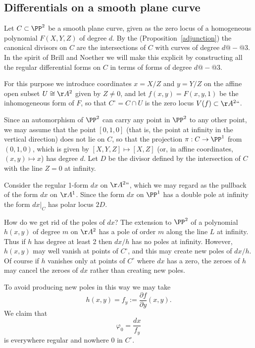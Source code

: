 \subsection{Differentials on a smooth plane curve}\label{canonical series on smooth plane curves}

Let $C \subset \PP^2$  be a smooth plane curve, given as the zero locus of a homogeneous polynomial $F(X,Y,Z)$ of degree $d$. By the 
%
(Proposition~\ref{adjunction}) the canonical  divisors on $C$
are the intersections of $C$ with curves of degree $d@{-}@3$. In the spirit of Brill and Noether we
will make this explicit by constructing all
 the 
regular differential forms
%
%
 on $C$ in terms of forms of degree $d@{-}@3$.

For this purpose we introduce coordinates $x = X/Z$ and $y = Y/Z$ on the affine open subset $U \cong \AA^2$ given by $Z \neq 0$, and let $f(x,y) = F(x, y,1)$ be the inhomogeneous form of $F$, so that $C^\circ = C \cap U$ is the zero locus $V(f) \subset  \AA^2` `$. 

Since an automorphism of $\PP^2$ can carry any point in $\PP^{2}$ to any other point, we may assume
that 
the point $[0,1,0]$ (that is, the point at infinity
in the vertical direction) does not lie on $C$, so that the
 projection  $\pi: C \to \PP^1$ from $(0,1,0)$, which is given by $[X,Y,Z] \mapsto [X,Z]$ (or, in affine coordinates, $(x,y) \mapsto x$)  has degree $d$. Let $D$ be the divisor defined by the intersection of $C$ with the line $Z=0$ at infinity.

Consider the
regular 1-form $dx$ on $\AA^2` `$, which we may regard as the pullback of the form $dx$ on
 $\AA^{1}$.
Since the form $dx$ on $\PP^{1}$ has a 
%
double pole
at infinity the form $dx|_{C}$ has polar
locus $2D$.
 
 \def\Co{{C^{\circ}}}
How do we get rid of the poles of $dx$? The extension to $\PP^2$ of a polynomial $h(x,y)$ of degree $m$ on
$\AA^2$ has a pole of order $m$ along the line $L$ at infinity. Thus if $h$ has degree at least 2 then $dx/h$ has no poles at infinity. However, $h(x,y)$ may well vanish at points of $\Co$, and this may create new poles of $dx/h$. Of course if $h$ vanishes only at  points of $\Co$ where $dx$ has a zero, the zeroes of $h$ may cancel the zeroes of $dx$ rather than creating new poles.
 
 To avoid producing new poles in this way we may take
 $$
 h(x,y) = f_{y} := \frac{\partial f}{\partial y}(x,y).
 $$
 We claim that 
 $$
\varphi_0 = \frac{dx}{f_{y}}
$$
is everywhere regular and nowhere 0 in $C^\circ$. 

